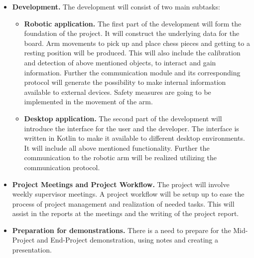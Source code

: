\documentclass[11pt,fleqn,twoside]{article}
\begin{document}
\begin{itemize}
    \item \textbf{Development.} The development will consist of two main subtasks:
          \begin{itemize}
            \item \textbf{Robotic application.} The first part of the development will form the foundation of the 
                         project. It will construct the underlying data for the board. Arm movements to pick up and 
                         place chess pieces and getting to a resting position will be produced. This will also 
                         include the calibration and detection of above mentioned objects, to interact and gain 
                         information. Further the communication module and its corresponding protocol will generate 
                         the possibility to make internal information available to external devices. Safety measures 
                         are going to be implemented in the movement of the arm.
                         
            \item  \textbf{Desktop application.} The second part of the development will introduce the interface for 
                          the user and the developer. The interface is written in Kotlin to make it available to 
                          different desktop environments. It will include all above mentioned functionality. 
                          Further the communication to the robotic arm will be realized utilizing the communication 
                          protocol.
          \end{itemize}
    
    \item \textbf{Project Meetings and Project Workflow.} The project will involve weekly supervisor meetings. A 
                  project workflow will be setup up to ease the process of project management and realization of 
                  needed tasks. This will assist in the reports at the meetings and the writing of the project 
                  report.

    \item \textbf{Preparation for demonstrations.} There is a need to prepare for the Mid-Project and End-Project 
                  demonstration, using notes and creating a presentation.
                  
\end{itemize}


\end{document}
